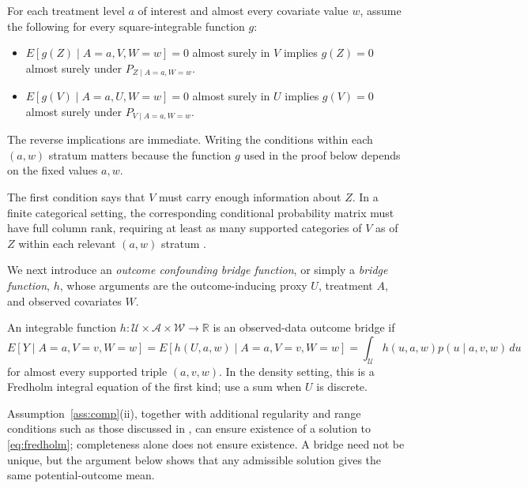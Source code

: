 \documentclass[11pt,twoside]{article}
\begin{document}
\begin{assumption}
\label{ass:comp}
For each treatment level $a$ of interest and almost every covariate value $w$, assume the following for every square-integrable function $g$:
\begin{itemize}
    \item[(i)] $E[g(Z)\mid A=a,V,W=w]=0$ almost surely in $V$ implies $g(Z)=0$ almost surely under $P_{Z\mid A=a,W=w}$.
    \item[(ii)] $E[g(V)\mid A=a,U,W=w]=0$ almost surely in $U$ implies $g(V)=0$ almost surely under $P_{V\mid A=a,W=w}$.
\end{itemize}
The reverse implications are immediate. Writing the conditions within each $(a,w)$ stratum matters because the function $g$ used in the proof below depends on the fixed values $a,w$.
\end{assumption}
The first condition says that $V$ must carry enough information about $Z$. In a finite categorical setting, the corresponding conditional probability matrix must have full column rank, requiring at least as many supported categories of $V$ as of $Z$ within each relevant $(a,w)$ stratum \cite{tchetgen2020introduction}.

We next introduce an \emph{outcome confounding bridge function}, or simply a \emph{bridge function}, $h$, whose arguments are the outcome-inducing proxy $U$, treatment $A$, and observed covariates $W$.
\begin{definition}
An integrable function $h:\mathcal U\times\mathcal A\times\mathcal W\to\mathbb R$ is an observed-data outcome bridge if
\begin{equation}
\label{eq:fredholm}
 E[Y\mid A=a,V=v,W=w]
 =E[h(U,a,w)\mid A=a,V=v,W=w]
 =\int_{\mathcal U}h(u,a,w)p(u\mid a,v,w)\,du
\end{equation}
for almost every supported triple $(a,v,w)$. In the density setting, this is a Fredholm integral equation of the first kind; use a sum when $U$ is discrete.
\end{definition}

Assumption~\ref{ass:comp}(ii), together with additional regularity and range conditions such as those discussed in \cite{miao2018proxy,mastouri2021proximal}, can ensure existence of a solution to \eqref{eq:fredholm}; completeness alone does not ensure existence. A bridge need not be unique, but the argument below shows that any admissible solution gives the same potential-outcome mean.
\end{document}
